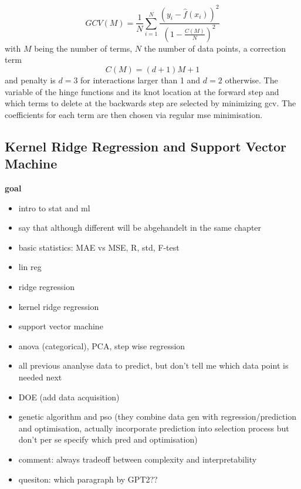 \begin{equation}
    GCV(M) = \frac{1}{N} \sum_{i=1}^{N} \frac{ \left(y_i - \hat{f}(x_i) \right)^2 } {\left( 1- \frac{C(M)}{N}\right)^2 }
\end{equation}
with $M$ being the number of terms, $N$ the number of data points, a correction term
\begin{equation}
    C(M) = (d + 1)M + 1
\end{equation}
and penalty is $d=3$ for interactions larger than 1 and $d=2$ otherwise.
The variable of the hinge functions and its knot location at the forward step and which terms to delete 
at the backwards step are selected by minimizing \gls{gcv}. 
The coefficients for each term are then chosen via regular \gls{mse} minimisation\cite{friedman1988fitting}.


\iffalse
\subsection{Kernel Ridge Regression and Support Vector Machine}
\textbf{goal}
\begin{itemize}
    \item intro to stat and ml 
    \item say that although different will be abgehandelt in the same chapter 
    \item basic statistics: MAE vs MSE, R, std, F-test 
    \item lin reg 
    \item ridge regression 
    \item kernel ridge regression 
    \item support vector machine 
    \item anova (categorical), PCA, step wise regression
    \item all previous ananlyse data to predict, but don't tell me which data point is needed next 
    \item DOE (add data acquisition)
    \item genetic algorithm and pso (they combine data gen with regression/prediction and optimisation, actually incorporate prediction into selection process but don't per se specify which pred and optimisation)
    \item comment: always tradeoff between complexity and interpretability
    \item quesiton: which paragraph by GPT2?? 
\end{itemize}

